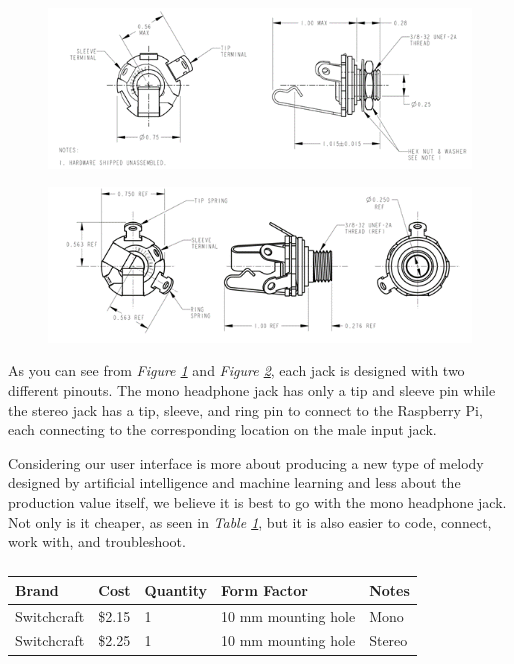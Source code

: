 \begin{figure}[h!]
  \centering
  \includegraphics[width=\linewidth]{image/Mono.png}
  \caption{}
  \label{fig:mono}
\end{figure}
\begin{figure}[h!]
  \centering
  \includegraphics[width=\linewidth]{image/Stereo.png}
  \caption{}
  \label{fig:stereo}
\end{figure}

As you can see from \textit{Figure \ref{fig:mono}} and \textit{Figure \ref{fig:stereo}}, each jack is designed with two different pinouts. The mono headphone jack has only a tip and sleeve pin while the stereo jack has a tip, sleeve, and ring pin to connect to the Raspberry Pi,  each connecting to the corresponding location on the male input jack.

Considering our user interface is more about producing a new type of melody designed by artificial intelligence and machine learning and less about the production value itself, we believe it is best to go with the mono headphone jack. Not only is it cheaper, as seen in \textit{Table \ref{Tab:jack_brand}}, but it is also easier to code, connect, work with, and troubleshoot.

\begin{table}[]
  \centering
  \begin{tabular}{|l|l|l|l|l|}
    \hline
    Brand       & Cost   & Quantity & Form Factor         & Notes  \\ \hline
    Switchcraft & \$2.15 & 1        & 10 mm mounting hole & Mono   \\ \hline
    Switchcraft & \$2.25 & 1        & 10 mm mounting hole & Stereo \\ \hline
  \end{tabular}
  \caption{}
  \label{Tab:jack_brand}
\end{table}

